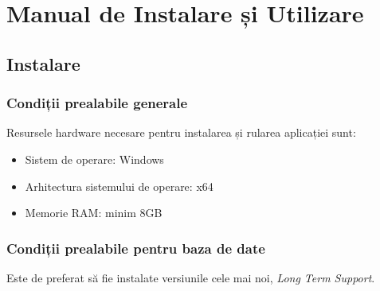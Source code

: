 \chapter{Manual de Instalare și Utilizare}
\pagestyle{fancy}

\section{Instalare}
\subsection{Condiții prealabile generale}
\noindent Resursele hardware necesare pentru instalarea și rularea aplicației sunt:
\begin{itemize}
    \setlength\itemsep{0.5em}
    \item Sistem de operare: Windows
    \item Arhitectura sistemului de operare: x64
    \item Memorie RAM: minim 8GB
\end{itemize}

\subsection{Condiții prealabile pentru baza de date}
Este de preferat să fie instalate versiunile cele mai noi, {\it Long Term Support}.\\

